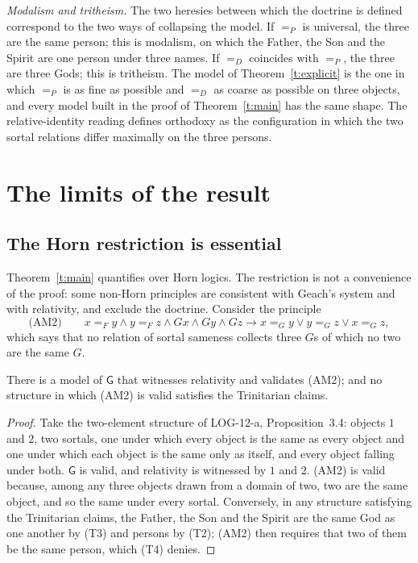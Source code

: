 \documentclass{situationist-preprint}
\begin{document}
\emph{Modalism and tritheism.} The two heresies between which the doctrine is defined correspond to the two ways of collapsing the model. If $=_P$ is universal, the three are the same person; this is modalism, on which the Father, the Son and the Spirit are one person under three names. If $=_D$ coincides with $=_P$, the three are three Gods; this is tritheism. The model of Theorem~\ref{t:explicit} is the one in which $=_P$ is as fine as possible and $=_D$ as coarse as possible on three objects, and every model built in the proof of Theorem~\ref{t:main} has the same shape. The relative-identity reading defines orthodoxy as the configuration in which the two sortal relations differ maximally on the three persons.

\section{The limits of the result}\label{s:limits}

\subsection{The Horn restriction is essential}

Theorem~\ref{t:main} quantifies over Horn logics. The restriction is not a convenience of the proof: some non-Horn principles are consistent with Geach's system and with relativity, and exclude the doctrine. Consider the principle
\[
\text{(AM2)}\qquad x =_F y \wedge y =_F z \wedge G x \wedge G y \wedge G z \to x =_G y \vee y =_G z \vee x =_G z,
\]
which says that no relation of sortal sameness collects three $G$s of which no two are the same $G$.

\begin{proposition}\label{p:horn}
There is a model of $\mathsf{G}$ that witnesses relativity and validates (AM2); and no structure in which (AM2) is valid satisfies the Trinitarian claims.
\end{proposition}

\begin{proof}
Take the two-element structure of LOG-12-a, Proposition~3.4: objects $1$ and $2$, two sortals, one under which every object is the same as every object and one under which each object is the same only as itself, and every object falling under both. $\mathsf{G}$ is valid, and relativity is witnessed by $1$ and $2$. (AM2) is valid because, among any three objects drawn from a domain of two, two are the same object, and so the same under every sortal. Conversely, in any structure satisfying the Trinitarian claims, the Father, the Son and the Spirit are the same God as one another by (T3) and persons by (T2); (AM2) then requires that two of them be the same person, which (T4) denies.
\end{proof}
\end{document}
